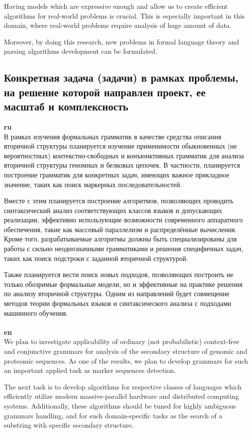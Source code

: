 \documentclass[12pt]{article}  %
\theoremstyle{remark}
\begin{document}
Having models which are expressive enough and allow us to create efficient algorithms for real-world problems is crucial.
This is especially important in this domain, where real-world problems require analysis of huge amount of data.

Moreover, by doing this research, new problems in formal language theory and parsing algorithms development can be formulated.


\subsection{Конкретная задача (задачи) в рамках проблемы, на решение которой направлен проект, ее масштаб и комплексность}

\textbf{ru}\\
В рамках изучения формальных грамматик в качестве средства описания вторичной структуры планируется изучение применимости обыкновенных (не вероятностных) контекстно-свободных и конъюнктивных грамматик для анализа вторичной структуры геномных и белковых цепочек.
В частности, планируется построение грамматик для конкретных задач, имеющих важное прикладное значение, таких как поиск маркерных последовательностей.

Вместе с этим планируется построение алгоритмов, позволяющих проводить синтаксический анализ соответствующих классов языков и допускающих реализации, эффективно использующие возможности современного аппаратного обеспечения, такие как массовый параллелизм и распределённые вычисления.
Кроме того, разрабатываемые алгоритмы должны быть специализированы для работы с сильно неоднозначными грамматиками и решения специфичных задач, таких как поиск подстроки с заданной вторичной структурой.

Также планируется вести поиск новых подходов, позволяющих построить не только обозримые формальные модели, но и эффективные на практике решения по анализу вторичной структуры.
Одним из направлений будет совмещение методов теории формальных языков и синтаксического анализа с подходами машинного обучения.
\\
\\
\textbf{en}\\
We plan to investigate applicability of ordinary (not probabilistic) context-free and conjunctive grammars for analysis of the secondary structure of genomic and proteomic sequences.
As one of the results, we plan to develop grammars for such an important applied task as marker sequences detection.

The next task is to develop algorithms for respective classes of languages which efficiently utilize modern massive-parallel hardware and distributed computing systems.
Additionally, these algorithms should be tuned for highly ambiguous grammars handling, and for such domain-specific tasks as the search of a substring with specific secondary structure.
\end{document}
